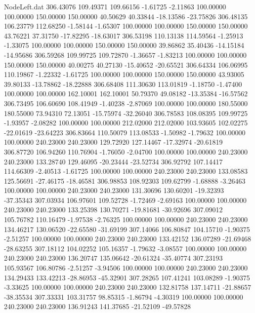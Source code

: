 \begin{filecontents}{NodeLeft.dat}
 306.43076  109.49371  109.66156    -1.61725   -2.11863  100.00000  100.00000  150.00000  150.00000   40.50629   40.33844  -18.13586  -23.75826
 306.48135  106.23779  112.68250    -1.58144   -1.65307  100.00000  100.00000  150.00000  150.00000   43.76221   37.31750  -17.82295  -18.63017
 306.53198  110.13138  114.59564    -1.25913   -1.33075  100.00000  100.00000  150.00000  150.00000   39.86862   35.40436  -14.15184  -14.95686
 306.59268  109.99725  109.72870    -1.36657   -1.83213  100.00000  100.00000  150.00000  150.00000   40.00275   40.27130  -15.40652  -20.65521
 306.64334  106.06995  110.19867    -1.22332   -1.61725  100.00000  100.00000  150.00000  150.00000   43.93005   39.80133  -13.78862  -18.22888
 306.68408  111.30630  113.01819    -1.18750   -1.47400  100.00000  100.00000  162.10001  162.10001   50.79370   49.08182  -13.35384  -16.57562
 306.73495  106.60690  108.41949    -1.40238   -2.87069  100.00000  100.00000  180.55000  180.55000   73.94310   72.13051  -15.75974  -32.26040
 306.78583  108.08395  109.99725    -1.93957   -2.08282  100.00000  100.00000  212.02000  212.02000  103.93605  102.02275  -22.01619  -23.64223
 306.83664  110.50079  113.08533    -1.50982   -1.79632  100.00000  100.00000  240.23000  240.23000  129.72920  127.14467  -17.32974  -20.61819
 306.87720  106.94260  110.76904    -1.76050   -2.04700  100.00000  100.00000  240.23000  240.23000  133.28740  129.46095  -20.23444  -23.52734
 306.92792  107.14417  114.66309    -2.40513   -1.61725  100.00000  100.00000  240.23000  240.23000  133.08583  125.56691  -27.46175  -18.46581
 306.98853  108.92303  109.62799    -1.68888   -3.26463  100.00000  100.00000  240.23000  240.23000  131.30696  130.60201  -19.32393  -37.35343
 307.03934  106.97601  109.52728    -1.72469   -2.69163  100.00000  100.00000  240.23000  240.23000  133.25398  130.70271  -19.81681  -30.92696
 307.09012  105.76782  110.16479    -1.97538   -2.76325  100.00000  100.00000  240.23000  240.23000  134.46217  130.06520  -22.65580  -31.69199
 307.14066  106.80847  104.15710    -1.90375   -2.51257  100.00000  100.00000  240.23000  240.23000  133.42152  136.07289  -21.69468  -28.63255
 307.18112  104.02252  105.16357    -1.79632   -3.08557  100.00000  100.00000  240.23000  240.23000  136.20747  135.06642  -20.61324  -35.40774
 307.23193  105.93567  106.80786    -2.51257   -3.94506  100.00000  100.00000  240.23000  240.23000  134.29433  133.42213  -28.86953  -45.32901
 307.28265  107.41241  103.08289    -1.90375   -3.33625  100.00000  100.00000  240.23000  240.23000  132.81758  137.14711  -21.88657  -38.35534
 307.33331  103.31757   98.85315    -1.86794   -4.30319  100.00000  100.00000  240.23000  240.23000  136.91243  141.37685  -21.52109  -49.57828

\end{filecontents}
